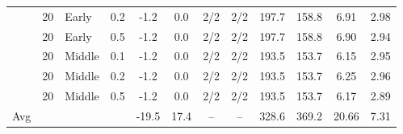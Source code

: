 \begin{table}[p]
{\begin{tabular}{lllc|cc|cc|cc|cc}
 & 20 & Early & 0.2 & -1.2 & 0.0 & 2/2 & 2/2 & 197.7 & 158.8 & 6.91 & 2.98 \\
 & 20 & Early & 0.5 & -1.2 & 0.0 & 2/2 & 2/2 & 197.7 & 158.8 & 6.90 & 2.94 \\
 & 20 & Middle & 0.1 & -1.2 & 0.0 & 2/2 & 2/2 & 193.5 & 153.7 & 6.15 & 2.95 \\
 & 20 & Middle & 0.2 & -1.2 & 0.0 & 2/2 & 2/2 & 193.5 & 153.7 & 6.25 & 2.96 \\
 & 20 & Middle & 0.5 & -1.2 & 0.0 & 2/2 & 2/2 & 193.5 & 153.7 & 6.17 & 2.89 \\
\midrule
Avg &  &  &  & -19.5 & 17.4 & -- & -- & 328.6 & 369.2 & 20.66 & 7.31 \\
\bottomrule
\end{tabular}%
}
\end{table}
